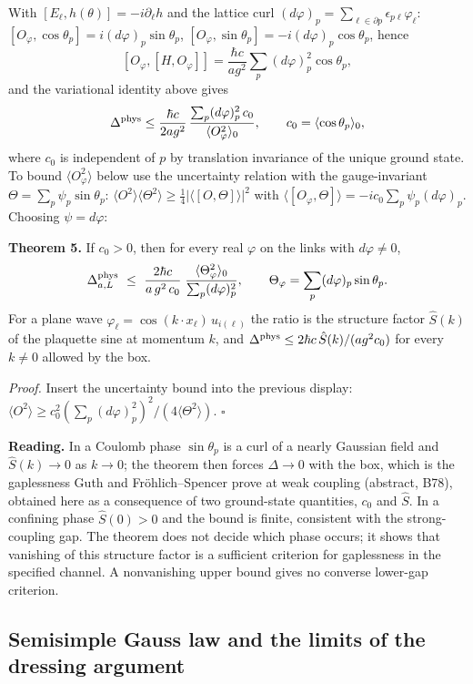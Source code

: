 \documentclass[11pt,a4paper]{article}
\begin{document}
With \([E_\ell,h(\theta)]=-i\partial_\ell h\) and the lattice curl
\((d\varphi)_p=\sum_{\ell\in\partial p}\epsilon_{p\ell}\varphi_\ell\):
\([O_\varphi,\cos\theta_p]=i(d\varphi)_p\sin\theta_p\),
\([O_\varphi,\sin\theta_p]=-i(d\varphi)_p\cos\theta_p\), hence
\[[O_\varphi,[H,O_\varphi]]=\frac{\hbar c}{ag^2}\sum_p(d\varphi)_p^2\cos\theta_p,\]
and the variational identity above gives
\[\Delta^{\rm phys}\le\frac{\hbar c}{2ag^2}\,\frac{\sum_p(d\varphi)_p^2\,c_0}{\langle O_\varphi^2\rangle_0},
\qquad c_0=\langle\cos\theta_p\rangle_0,\] where \(c_0\) is independent
of \(p\) by translation invariance of the unique ground state. To bound
\(\langle O_\varphi^2\rangle\) below use the uncertainty relation with
the gauge-invariant \(\Theta=\sum_p\psi_p\sin\theta_p\):
\(\langle O^2\rangle\langle\Theta^2\rangle\ge\tfrac14|\langle[O,\Theta]\rangle|^2\)
with \(\langle[O_\varphi,\Theta]\rangle=-ic_0\sum_p\psi_p(d\varphi)_p\).
Choosing \(\psi=d\varphi\):

\textbf{Theorem 5.} If \(c_0>0\), then for every real \(\varphi\) on the
links with \(d\varphi\ne0\),
\[\Delta^{\rm phys}_{a,L}\ \le\ \frac{2\hbar c}{a\,g^2\,c_0}\;
\frac{\langle\Theta_\varphi^2\rangle_0}{\sum_p(d\varphi)_p^2},
\qquad\Theta_\varphi=\sum_p(d\varphi)_p\sin\theta_p .\] For a plane wave
\(\varphi_\ell=\cos(k\cdot x_\ell)\,u_{i(\ell)}\) the ratio is the
structure factor \(\hat S(k)\) of the plaquette sine at momentum \(k\),
and \(\Delta^{\rm phys}\le2\hbar c\,\hat S(k)/(ag^2c_0)\) for every
\(k\ne0\) allowed by the box.

\emph{Proof.} Insert the uncertainty bound into the previous display:
\(\langle O^2\rangle\ge c_0^2(\sum_p(d\varphi)_p^2)^2/(4\langle\Theta^2\rangle)\).
\(\square\)

\textbf{Reading.} In a Coulomb phase \(\sin\theta_p\) is a curl of a
nearly Gaussian field and \(\hat S(k)\to0\) as \(k\to0\); the theorem
then forces \(\Delta\to0\) with the box, which is the gaplessness Guth
and Fröhlich--Spencer prove at weak coupling (abstract, B78), obtained
here as a consequence of two ground-state quantities, \(c_0\) and
\(\hat S\). In a confining phase \(\hat S(0)>0\) and the bound is
finite, consistent with the strong-coupling gap. The theorem does not
decide which phase occurs; it shows that vanishing of this structure
factor is a sufficient criterion for gaplessness in the specified
channel. A nonvanishing upper bound gives no converse lower-gap
criterion.

\hypertarget{semisimple-gauss-law-and-the-limits-of-the-dressing-argument}{%
\subsection{Semisimple Gauss law and the limits of the dressing
argument}\label{semisimple-gauss-law-and-the-limits-of-the-dressing-argument}}
\end{document}
